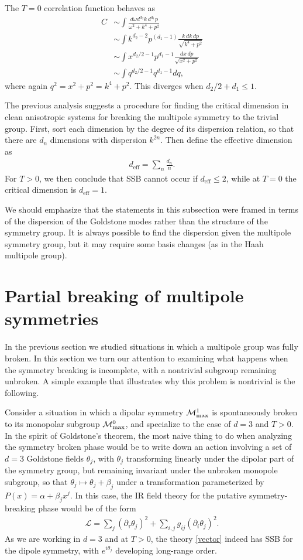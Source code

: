 \documentclass[prb,aps,twocolumn, amsfonts,amsmath,amssymb,nofootinbib,superscriptaddress]{revtex4-2}
\newcommand{\nn}{\nonumber\\}
\newcommand{\eff}{\text{eff}}
\renewcommand{\t}{\theta}
\newcommand{\mcm}{\mathcal{M}}
\begin{document}
The $T=0$ correlation function behaves as
\begin{align}
C &\sim \int \frac{d\omega d^{d_2} k \, d^{d_1} p}{\omega^2 + k^4 + p^2}\nn
&\sim \int k^{d_2 - 2} p^{ (d_1-1)} \frac{k\,dk\, dp}{\sqrt{k^4 + p^2}} \nn
&\sim \int x^{d_2/2-1} p^{d_1-1} \frac{dx\, dp}{\sqrt{x^2 + p^2}} \nn
&\sim \int q^{d_2/2 -1} q^{d_1 -1} dq,
\end{align}
where again $q^2 = x^2 + p^2 = k^4 + p^2$. This diverges when $d_2/2 + d_1 \le 1$. 

The previous analysis suggests a procedure for finding the critical dimension in clean anisotropic systems for breaking the multipole symmetry to the trivial group. First, sort each dimension by the degree of its dispersion relation, so that there are $d_n$ dimensions with dispersion $k^{2n}$. Then define the effective dimension as 
\begin{align}
d_\eff = \sum_n \frac{d_n}{n}.
\end{align}
For $T>0$, we then conclude that SSB cannot occur if $d_\eff\le 2$, while at $T=0$ the critical dimension is $d_\eff = 1$.

We should emphasize that the statements in this subsection were framed in terms of the dispersion of the Goldstone modes rather than the structure of the symmetry group. It is always possible to find the dispersion given the multipole symmetry group, but it may require some basis changes (as in the Haah multipole group).

\section{Partial breaking of multipole symmetries} \label{sec:partial}

In the previous section we studied situations in which a multipole group was fully broken. In this section we turn our attention to examining what happens when the symmetry breaking is incomplete, with a nontrivial subgroup remaining unbroken. A simple example that illustrates why this problem is nontrivial is the following. 
 
Consider a situation in which a dipolar symmetry $\mcm^1_{\rm max}$ is spontaneously broken to its monopolar subgroup $\mcm^0_{\rm max}$, and specialize to the case of $d=3$ and $T>0$. In the spirit of Goldstone's theorem, the most naive thing to do when analyzing the symmetry broken phase would be to write down an action involving a set of $d=3$ Goldstone fields $\theta_j$, with $\t_j$ transforming linearly under the dipolar part of the symmetry group, but remaining invariant under the unbroken monopole subgroup, so that $\theta_j \mapsto \theta_j + \beta_j$ under a transformation parameterized by $P(x) = \alpha + \beta_j x^j$. In this case, the IR field theory for the putative symmetry-breaking phase would be of the form 
\begin{align}
\label{vector} \mathcal{L}= \sum_j  (\partial_\tau \theta_j)^2 + \sum_{i,j} g_{ij} (\partial_i \theta_j)^2.
\end{align}
As we are working in $d=3$ and at $T>0$, the theory \eqref{vector} indeed has SSB for the dipole symmetry, with $e^{i\t_j}$ developing long-range order. 
\end{document}
